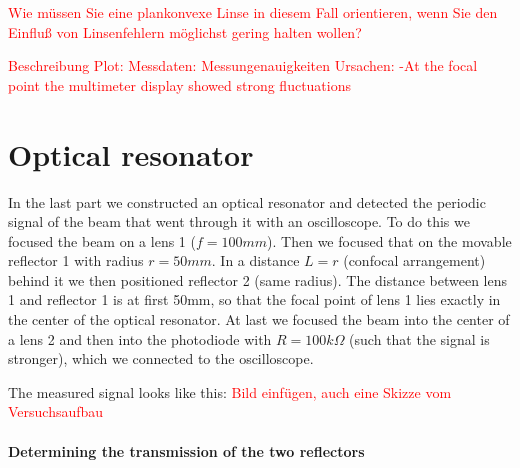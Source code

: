 \documentclass{article}
\begin{document}
\textcolor{red}{
Wie müssen Sie eine plankonvexe Linse in diesem Fall orientieren, wenn Sie den Einfluß von Linsenfehlern möglichst gering halten wollen?}

\textcolor{red}{
Beschreibung Plot:
Messdaten:
Messungenauigkeiten Ursachen:
-At the focal point the multimeter display showed strong fluctuations}

\section{Optical resonator}

In the last part we constructed an optical resonator and detected the periodic signal of the beam that went through it with an oscilloscope. To do this we focused the beam on a lens 1 ($f=100mm$). Then we focused that on the movable reflector 1 with radius $r = 50mm$. In a distance $L=r$ (confocal arrangement) behind it we then positioned reflector 2 (same radius). The distance between lens 1 and reflector 1 is at first 50mm, so that the focal point of lens 1 lies exactly in the center of the optical resonator. At last we focused the beam into the center of a lens 2 and then into the photodiode with $R=100k\Omega$ (such that the signal is stronger), which we connected to the oscilloscope.

The measured signal looks like this:
\textcolor{red}{Bild einfügen, auch eine Skizze vom Versuchsaufbau}

\paragraph{Determining the transmission of the two reflectors}
\end{document}
